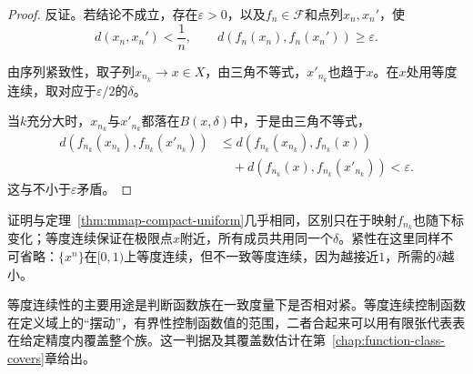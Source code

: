 \begin{proof}
反证。若结论不成立，存在$\varepsilon>0$，以及$f_n\in\mathcal F$和点列$x_n,x_n'$，使
\[
 d(x_n,x_n')<\frac1n,\qquad d(f_n(x_n),f_n(x_n'))\geq\varepsilon.
\]

由序列紧致性，取子列$x_{n_k}\to x\in X$，由三角不等式，$x'_{n_k}$也趋于$x$。在$x$处用等度连续，取对应于$\varepsilon/2$的$\delta$。

当$k$充分大时，$x_{n_k}$与$x'_{n_k}$都落在$B(x,\delta)$中，于是由三角不等式，
\[
 \begin{aligned}
 d(f_{n_k}(x_{n_k}),f_{n_k}(x'_{n_k}))
 &\leq d(f_{n_k}(x_{n_k}),f_{n_k}(x))\\
 &\quad+d(f_{n_k}(x),f_{n_k}(x'_{n_k}))<\varepsilon.
 \end{aligned}
\]
这与不小于$\varepsilon$矛盾。
\end{proof}

证明与定理~\ref{thm:mmap-compact-uniform}几乎相同，区别只在于映射$f_{n_k}$也随下标变化；等度连续保证在极限点$x$附近，所有成员共用同一个$\delta$。紧性在这里同样不可省略：$\{x^n\}$在$[0,1)$上等度连续，但不一致等度连续，因为越接近$1$，所需的$\delta$越小。

等度连续性的主要用途是判断函数族在一致度量下是否相对紧。等度连续控制函数在定义域上的“摆动”，有界性控制函数值的范围，二者合起来可以用有限张代表表在给定精度内覆盖整个族。这一判据及其覆盖数估计在第~\ref{chap:function-class-covers}章给出。
